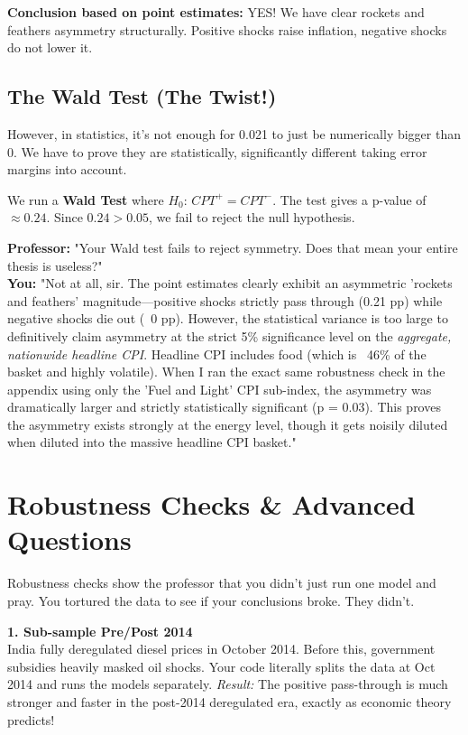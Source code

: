 \documentclass[12pt,a4paper]{report}
\begin{document}
\textbf{Conclusion based on point estimates:} YES! We have clear rockets and feathers asymmetry structurally. Positive shocks raise inflation, negative shocks do not lower it.

\section{The Wald Test (The Twist!)}
However, in statistics, it's not enough for 0.021 to just be numerically bigger than 0. We have to prove they are statistically, significantly different taking error margins into account.

We run a \textbf{Wald Test} where $H_0$: $CPT^+ = CPT^-$.
The test gives a p-value of $\approx 0.24$. Since $0.24 > 0.05$, we fail to reject the null hypothesis.

\textbf{Professor:} "Your Wald test fails to reject symmetry. Does that mean your entire thesis is useless?"\\
\textbf{You:} "Not at all, sir. The point estimates clearly exhibit an asymmetric 'rockets and feathers' magnitude—positive shocks strictly pass through (0.21 pp) while negative shocks die out (~0 pp). However, the statistical variance is too large to definitively claim asymmetry at the strict 5\% significance level on the \textit{aggregate, nationwide headline CPI}. Headline CPI includes food (which is ~46\% of the basket and highly volatile). When I ran the exact same robustness check in the appendix using only the 'Fuel and Light' CPI sub-index, the asymmetry was dramatically larger and strictly statistically significant (p = 0.03). This proves the asymmetry exists strongly at the energy level, though it gets noisily diluted when diluted into the massive headline CPI basket."

\newpage
\chapter{Robustness Checks \& Advanced Questions}

Robustness checks show the professor that you didn't just run one model and pray. You tortured the data to see if your conclusions broke. They didn't. 

\textbf{1. Sub-sample Pre/Post 2014}\\
India fully deregulated diesel prices in October 2014. Before this, government subsidies heavily masked oil shocks. Your code literally splits the data at Oct 2014 and runs the models separately. \textit{Result:} The positive pass-through is much stronger and faster in the post-2014 deregulated era, exactly as economic theory predicts!
\end{document}
